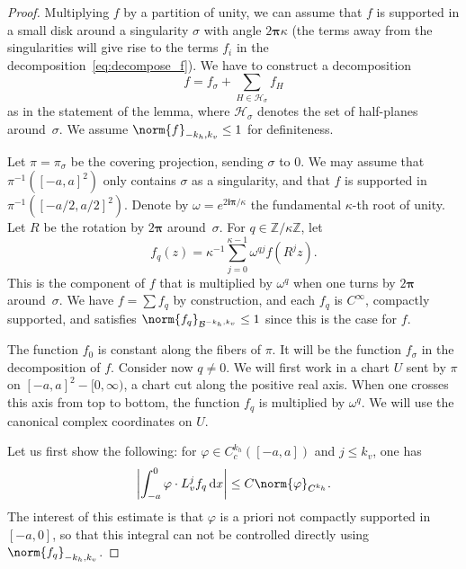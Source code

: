 \documentclass[10pt]{amsart}
\newcommand{\boH}{\mathcal{H}}
\newcommand{\boB}{\mathcal{B}}
\newcommand{\Z}{\mathbb{Z}}
\newcommand{\dd}{\mathop{}\!\mathrm{d}}
\newcommand{\ic}{\mathbf{i}}
\newcommand{\bpi}{\boldsymbol{\pi}}
\newcommand{\absgg}[1]{\biggl \lvert#1\biggr\rvert}
\let\phi\varphi
\theoremstyle{definition}
\numberwithin{equation}{section}
\begin{document}
\begin{proof}
Multiplying $f$ by a partition of unity, we can assume that $f$ is supported
in a small disk around a singularity $\sigma$ with angle $2\bpi\kappa$ (the
terms away from the singularities will give rise to the terms $f_i$ in the
decomposition~\eqref{eq:decompose_f}). We have to construct a decomposition
\begin{equation}
\label{eq:wpuxcvopiuwxopicv}
f = f_\sigma + \sum_{H\in \boH_\sigma} f_H
\end{equation}
as in the statement of the lemma, where $\boH_\sigma$ denotes the set of
half-planes around~$\sigma$. We assume $\norm{f}_{-k_h, k_v}\leq 1$ for
definiteness.

Let $\pi=\pi_\sigma$ be the covering projection, sending $\sigma$ to $0$. We
may assume that $\pi^{-1}([-a,a]^2)$ only contains $\sigma$ as a singularity,
and that $f$ is supported in $\pi^{-1}([-a/2, a/2]^2)$. Denote by $\omega =
e^{2\ic\bpi/\kappa}$ the fundamental $\kappa$-th root of unity. Let $R$ be
the rotation by $2\bpi$ around~$\sigma$. For $q \in \Z/\kappa \Z$, let
\[
f_q(z) = \kappa^{-1} \sum_{j=0}^{\kappa-1} \omega^{qj} f(R^j z).
\]
This is
the component of $f$ that is multiplied by $\omega^q$ when one turns by
$2\bpi$ around~$\sigma$. We have $f = \sum f_q$ by construction, and each
$f_q$ is $C^\infty$, compactly supported, and satisfies
$\norm{f_q}_{\boB^{-k_h, k_v}} \leq 1$ since this is the case for $f$.

The function $f_0$ is constant along the fibers of $\pi$. It will be the
function $f_\sigma$ in the decomposition of $f$. Consider now $q\neq 0$. We
will first work in a chart $U$ sent by $\pi$ on $[-a,a]^2 -[0, \infty)$,
\ie a chart cut along the positive real axis. When one crosses this axis
from top to bottom, the function $f_q$ is multiplied by $\omega^q$. We will
use the canonical complex coordinates on $U$.

Let us first show the following: for $\phi \in C_c^{k_h}([-a,a])$ and $j \leq
k_v$, one has
\begin{equation}
\label{eq:f_q_restr}
\absgg{\int_{-a}^0 \phi \cdot L_v^j f_q \dd x} \leq C \norm{\phi}_{C^{k_h}}.
\end{equation}
The interest of this estimate is that $\phi$ is a priori not compactly
supported in $[-a, 0]$, so that this integral can not be controlled directly
using $\norm{f_q}_{-k_h, k_v}$.


\end{proof}
\end{document}
